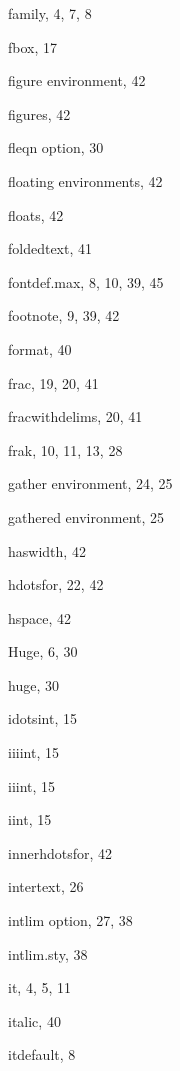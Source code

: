 \begin{theindex}
  \item {\ptt \bslash family}, 4, 7, 8
  \item {\ptt \bslash fbox}, 17
  \item {\ptt {}figure} environment, 42
  \item figures, 42
  \item {\ptt {}fleqn} option, 30
  \item floating environments, 42
  \item floats, 42
  \item {\ptt \bslash foldedtext}, 41
  \item {\ptt {}fontdef.max}, 8, 10, 39, 45
  \item {\ptt \bslash footnote}, 9, 39, 42
  \item {\ptt \bslash format}, 40
  \item {\ptt \bslash frac}, 19, 20, 41
  \item {\ptt \bslash fracwithdelims}, 20, 41
  \item {\ptt \bslash frak}, 10, 11, 13, 28

  \indexspace

  \item {\ptt {}gather} environment, 24, 25
  \item {\ptt {}gathered} environment, 25

  \indexspace

  \item {\ptt \bslash haswidth}, 42
  \item {\ptt \bslash hdotsfor}, 22, 42
  \item {\ptt \bslash hspace}, 42
  \item {\ptt \bslash Huge}, 6, 30
  \item {\ptt \bslash huge}, 30

  \indexspace

  \item {\ptt \bslash idotsint}, 15
  \item {\ptt \bslash iiiint}, 15
  \item {\ptt \bslash iiint}, 15
  \item {\ptt \bslash iint}, 15
  \item {\ptt \bslash innerhdotsfor}, 42
  \item {\ptt \bslash intertext}, 26
  \item {\ptt {}intlim} option, 27, 38
  \item {\ptt {}intlim.sty}, 38
  \item {\ptt \bslash it}, 4, 5, 11
  \item {\ptt \bslash italic}, 40
  \item {\ptt \bslash itdefault}, 8


\end{theindex}
